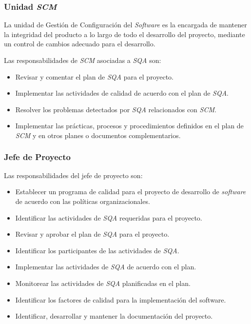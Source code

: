\subsubsection{Unidad \textit{SCM}}

La unidad de Gestión de Configuración del \textit{Software} es la encargada de mantener la integridad del producto a lo largo de todo el desarrollo del proyecto, mediante un control de cambios adecuado para el desarrollo.

Las responsabilidades de \textit{SCM} asociadas a \textit{SQA} son: 

	\begin{itemize}
		\item 
		Revisar y comentar el plan de \textit{SQA} para el proyecto. 
		\item
		Implementar las actividades de calidad de acuerdo con el plan de \textit{SQA}. 
		 \item
		Resolver los problemas detectados por \textit{SQA} relacionados con \textit{SCM}.
		 \item 
		Implementar las prácticas, procesos y procedimientos definidos en el plan de \textit{SCM} y en otros planes o documentos complementarios.
	\end{itemize}

\subsubsection{Jefe de Proyecto}

Las responsabilidades del jefe de proyecto son:

\begin{itemize}
		\item 
		Establecer un programa de calidad para el proyecto de desarrollo de \textit{software} de acuerdo con las políticas organizacionales.
		\item
		Identificar las actividades de \textit{SQA} requeridas para el proyecto.
		\item
		Revisar y aprobar el plan de \textit{SQA} para el proyecto.
		\item 
		Identificar los participantes de las actividades de \textit{SQA}.
		\item
		Implementar las actividades de \textit{SQA} de acuerdo con el plan.
		\item
		Monitorear las actividades de \textit{SQA} planificadas en el plan.
		\item
		Identificar los factores de calidad para la implementación del software.
		\item
		Identificar, desarrollar y mantener la documentación del proyecto. 
	\end{itemize}

